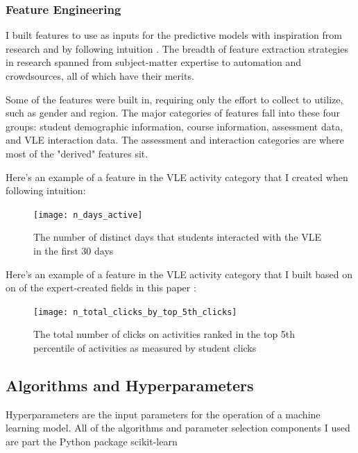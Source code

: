 \documentclass{article}
\begin{document}
            \subsubsection{Feature Engineering}
                I built features to use as inputs for the predictive models with inspiration from research and by following intuition \cite{automl2021, early2019}.
                The breadth of feature extraction strategies in research spanned from subject-matter expertise to automation and crowdsources, all of which have their merits.
                
                Some of the features were built in, requiring only the effort to collect to utilize, such as gender and region.
                The major categories of features fall into these four groups: student demographic information, course information, assessment data, and VLE interaction data. 
                The assessment and interaction categories are where most of the "derived" features sit.

                Here's an example of a feature in the VLE activity category that I created when following intuition:
                \begin{figure}
                    \centering
                    \texttt{[image: n\_days\_active]}
                    \caption{The number of distinct days that students interacted with the VLE in the first 30 days}
                    \label{fig:n_days_active}
                \end{figure}

                Here's an example of a feature in the VLE activity category that I built based on on of the expert-created fields in this paper \cite{automl2021}:
                \begin{figure}
                    \centering
                    \texttt{[image: n\_total\_clicks\_by\_top\_5th\_clicks]}
                    \caption{The total number of clicks on activities ranked in the top 5th percentile of activities as measured by student clicks}
                    \label{fig:n_total_clicks_by_top_5th_clicks}
                \end{figure}

        
        \subsection{Algorithms and Hyperparameters}
            Hyperparameters are the input parameters for the operation of a machine learning model.
            All of the algorithms and parameter selection components I used are part the Python package scikit-learn \cite{sklearn}
\end{document}
